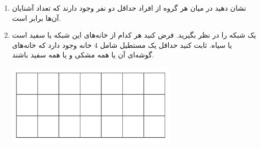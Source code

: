     \p 
\begin{enumerate}
\item
نشان دهید در میان هر گروه از افراد حداقل دو نفر وجود دارند که تعداد آشنایان آن‌ها برابر است.
\item
یک شبکه را در نظر بگیرید. فرض کنید هر کدام از خانه‌های این شبکه یا سفید است یا سیاه. ثابت کنید حداقل یک مستطیل شامل
$4$
خانه وجود دارد که خانه‌های گوشه‌ای آن یا همه مشکی و یا همه سفید باشند.
\begin{center}
\includegraphics[height=4cm]{1.png}
\end{center}
\end{enumerate}